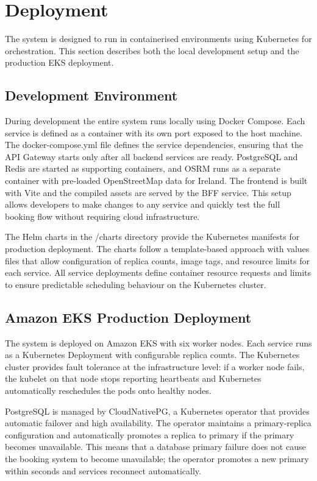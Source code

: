 \documentclass{article}
\begin{document}
\section{Deployment}
The system is designed to run in containerised environments using Kubernetes for orchestration. This section describes both the local development setup and the production EKS deployment.

\subsection{Development Environment}
During development the entire system runs locally using Docker Compose. Each service is defined as a container with its own port exposed to the host machine. The docker-compose.yml file defines the service dependencies, ensuring that the API Gateway starts only after all backend services are ready. PostgreSQL and Redis are started as supporting containers, and OSRM runs as a separate container with pre-loaded OpenStreetMap data for Ireland. The frontend is built with Vite and the compiled assets are served by the BFF service. This setup allows developers to make changes to any service and quickly test the full booking flow without requiring cloud infrastructure.

The Helm charts in the /charts directory provide the Kubernetes manifests for production deployment. The charts follow a template-based approach with values files that allow configuration of replica counts, image tags, and resource limits for each service. All service deployments define container resource requests and limits to ensure predictable scheduling behaviour on the Kubernetes cluster.

\subsection{Amazon EKS Production Deployment}
The system is deployed on Amazon EKS with six worker nodes. Each service runs as a Kubernetes Deployment with configurable replica counts. The Kubernetes cluster provides fault tolerance at the infrastructure level: if a worker node fails, the kubelet on that node stops reporting heartbeats and Kubernetes automatically reschedules the pods onto healthy nodes.

PostgreSQL is managed by CloudNativePG, a Kubernetes operator that provides automatic failover and high availability. The operator maintains a primary-replica configuration and automatically promotes a replica to primary if the primary becomes unavailable. This means that a database primary failure does not cause the booking system to become unavailable; the operator promotes a new primary within seconds and services reconnect automatically.
\end{document}
